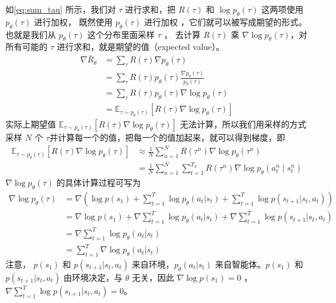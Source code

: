如\eqref{eq:sum_tau} 所示，我们对 $\tau$ 进行求和，把 $R(\tau)$  和  $\log p_{\theta}(\tau)$ 这两项使用 $p_{\theta}(\tau)$ 进行加权， 既然使用 $p_{\theta}(\tau)$ 进行加权 ，它们就可以被写成期望的形式。也就是我们从 $p_{\theta}(\tau)$ 这个分布里面采样 $\tau$ ， 去计算 $R(\tau)$ 乘 $\nabla\log p_{\theta}(\tau)$，对所有可能的 $\tau$ 进行求和，就是期望的值（expected value）。
\begin{equation}
    \label{eq:sum_tau}
    \begin{aligned}
        \nabla \bar{R}_{\theta}&=\sum_{\tau} R(\tau) \nabla p_{\theta}(\tau)\\&=\sum_{\tau} R(\tau) p_{\theta}(\tau) \frac{\nabla p_{\theta}(\tau)}{p_{\theta}(\tau)} \\&=
        \sum_{\tau} R(\tau) p_{\theta}(\tau) \nabla \log p_{\theta}(\tau) \\
        &=\mathbb{E}_{\tau \sim p_{\theta}(\tau)}\left[R(\tau) \nabla \log p_{\theta}(\tau)\right]
        \end{aligned}
\end{equation}
实际上期望值 $\mathbb{E}_{\tau \sim p_{\theta}(\tau)}\left[R(\tau) \nabla \log p_{\theta}(\tau)\right]$
无法计算，所以我们用采样的方式采样 $N$ 个 $\tau$并计算每一个的值，把每一个的值加起来，就可以得到梯度，即
\begin{equation}
    \label{eq:}
    \begin{aligned}
        \mathbb{E}_{\tau \sim p_{\theta}(\tau)}\left[R(\tau) \nabla \log p_{\theta}(\tau)\right] &\approx \frac{1}{N} \sum_{n=1}^{N} R\left(\tau^{n}\right) \nabla \log p_{\theta}\left(\tau^{n}\right) \\
        &=\frac{1}{N} \sum_{n=1}^{N} \sum_{t=1}^{T_{n}} R\left(\tau^{n}\right) \nabla \log p_{\theta}\left(a_{t}^{n} \mid s_{t}^{n}\right)
        \end{aligned}
\end{equation}
$\nabla \log p_{\theta}(\tau)$ 的具体计算过程可写为
\begin{equation}
    \label{eq:}
    \begin{aligned}
        \nabla \log p_{\theta}(\tau) &= \nabla \left(\log p(s_1)+\sum_{t=1}^{T}\log p_{\theta}(a_t|s_t)+ \sum_{t=1}^{T}\log p(s_{t+1}|s_t,a_t) \right) \\
        &= \nabla \log p(s_1)+ \nabla \sum_{t=1}^{T}\log p_{\theta}(a_t|s_t)+  \nabla \sum_{t=1}^{T}\log p(s_{t+1}|s_t,a_t) \\
        &=\nabla \sum_{t=1}^{T}\log p_{\theta}(a_t|s_t)\\
        &=\sum_{t=1}^{T} \nabla\log p_{\theta}(a_t|s_t)
        \end{aligned}
\end{equation}
注意， $p(s_1)$ 和 $p(s_{t+1}|s_t,a_t)$ 来自环境，$p_\theta(a_t|s_t)$ 来自智能体。$p(s_1)$ 和 $p(s_{t+1}|s_t,a_t)$ 由环境决定，与 $\theta$ 无关，因此 $\nabla \log p(s_1)=0$ ，$\nabla \sum_{t=1}^{T}\log p(s_{t+1}|s_t,a_t)=0$。

